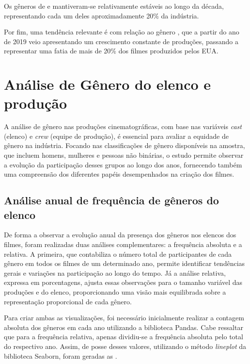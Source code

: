 Os gêneros de  e  mantiveram-se relativamente estáveis ao longo da década, representando cada um deles aproximadamente 20\% da indústria.

Por fim, uma tendência relevante é com relação ao gênero , que a partir do ano de 2019 veio apresentando um crescimento constante de produções, passando a representar uma fatia de mais de 20\% dos filmes produzidos pelos EUA.

\section{Análise de Gênero do elenco e produção}
A análise de gênero nas produções cinematográficas, com base nas variáveis \textit{cast} (elenco) e \textit{crew} (equipe de produção), é essencial para avaliar a equidade de gênero na indústria. Focando nas classificações de gênero disponíveis na amostra, que incluem homens, mulheres e pessoas não binárias, o estudo permite observar a evolução da participação desses grupos ao longo dos anos, fornecendo também uma compreensão dos diferentes papéis desempenhados na criação dos filmes.

\subsection{Análise anual de frequência de gêneros do elenco}\label{freq-genero}
De forma a observar a evolução anual da presença dos gêneros nos elencos dos filmes, foram realizadas duas análises complementares: a frequência absoluta e a relativa. A primeira, que contabiliza o número total de participantes de cada gênero em todos os filmes de um determinado ano, permite identificar tendências gerais e variações na participação ao longo do tempo. Já a análise relativa, expressa em porcentagens, ajusta essas observações para o tamanho variável das produções e do elenco, proporcionando uma visão mais equilibrada sobre a representação proporcional de cada gênero.

Para criar ambas as visualizações, foi necessário inicialmente realizar a contagem absoluta dos gêneros em cada ano utilizando a biblioteca Pandas\cite{pandas}. Cabe ressaltar que para a frequência relativa, apenas dividiu-se a frequência absoluta pelo total do respectivo ano. Assim,  de posse desses valores, utilizando o método \textit{lineplot} da biblioteca Seaborn\cite{seaborn}, foram geradas as .

%

